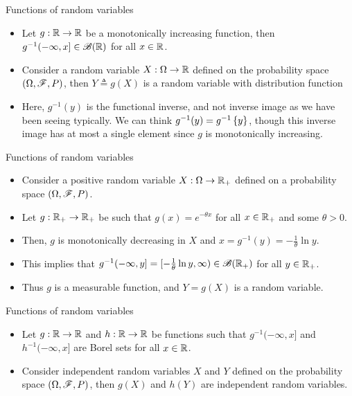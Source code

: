 \documentclass[12pt,aspectratio=169]{beamer}
\begin{document}
\begin{frame}{Functions of random variables}
\begin{Example} 
\begin{itemize}
\item <1-> Let $g:\mathbb{R} \to \mathbb{R}$ be a monotonically increasing function, 
then $g^{-1}(-\infty, x] %
\in \sB(\R)$ for all $x \in \mathbb{R}$. 
\item <2-> Consider a random variable $X: \Omega \to \mathbb{R}$ defined on the probability space $(\Omega, \mathscr{F}, P)$, 
then $Y \triangleq g(X)$ is a random variable with distribution function
\item <3-> Here, $g^{-1}(y)$ is the functional inverse, and not inverse image as we have been seeing typically. 
We can think $g^{-1}(y) = g^{-1}\left\{y\right\}$, though this inverse image has at most a single element since $g$ is monotonically increasing. 
\end{itemize}
\end{Example}
\end{frame}

\begin{frame}{Functions of random variables}
\begin{Example}
\begin{itemize}
\item <1-> Consider a positive random variable $X: \Omega \to \mathbb{R}_+$ defined on a probability space $(\Omega,\mathscr{F},P)$.    
\item <2-> Let $g: \mathbb{R}_+ \to \mathbb{R}_+$ be such that $g(x) = e^{-\theta x}$ for all $x \in \mathbb{R}_+$ and some $\theta > 0$.  
\item <3-> Then, $g$ is monotonically decreasing in $X$ and $x = g^{-1}(y) = -\frac{1}{\theta}\ln y$. 
\item <4-> This implies that $g^{-1}(-\infty, y] = [-\frac{1}{\theta}\ln y, \infty) \in \mathscr{B}(\mathbb{R}_+)$ for all $y \in \mathbb{R}_+$. 
\item <5-> Thus $g$ is a measurable function, and $Y = g(X)$ is a random variable.
\end{itemize}
\end{Example}
\end{frame}

\begin{frame}{Functions of random variables}
\begin{prop} 
\begin{itemize}
\item <1-> Let $g:\mathbb{R} \to \mathbb{R}$ and $h: \mathbb{R} \to \mathbb{R}$ be functions such that $g^{-1}(-\infty, x]$ and $h^{-1}(-\infty, x]$ are Borel sets for all $x \in \mathbb{R}$. \\
\item <2-> Consider independent random variables $X$ and $Y$ defined on the probability space $(\Omega, \mathscr{F}, P)$, 
then $g(X)$ and $h(Y)$ are independent random variables. 
\end{itemize}
\end{prop}
\end{frame}
\end{document}
